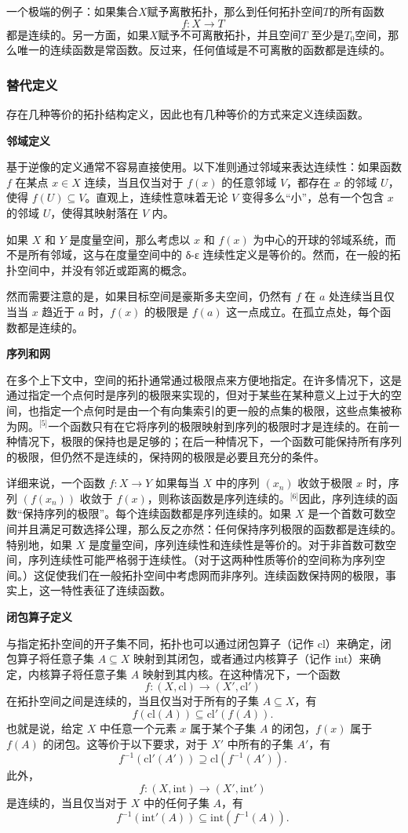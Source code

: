 一个极端的例子：如果集合$X$赋予离散拓扑，那么到任何拓扑空间$T$的所有函数
$$
f \colon X \rightarrow T~
$$
都是连续的。另一方面，如果$X$赋予不可离散拓扑，并且空间$T$ 至少是$T_0$空间，那么唯一的连续函数是常函数。反过来，任何值域是不可离散的函数都是连续的。
\subsubsection{替代定义}
存在几种等价的拓扑结构定义，因此也有几种等价的方式来定义连续函数。

\textbf{邻域定义}

基于逆像的定义通常不容易直接使用。以下准则通过邻域来表达连续性：如果函数 $f$ 在某点 $x \in X$ 连续，当且仅当对于 $f(x)$ 的任意邻域 $V$，都存在 $x$ 的邻域 $U$，使得 $f(U) \subseteq V$。直观上，连续性意味着无论 $V$ 变得多么“小”，总有一个包含 $x$ 的邻域 $U$，使得其映射落在 $V$ 内。

如果 $X$ 和 $Y$ 是度量空间，那么考虑以 $x$ 和 $f(x)$ 为中心的开球的邻域系统，而不是所有邻域，这与在度量空间中的 δ-ε 连续性定义是等价的。然而，在一般的拓扑空间中，并没有邻近或距离的概念。

然而需要注意的是，如果目标空间是豪斯多夫空间，仍然有 $f$ 在 $a$ 处连续当且仅当当 $x$ 趋近于 $a$ 时，$f(x)$ 的极限是 $f(a)$ 这一点成立。在孤立点处，每个函数都是连续的。

\textbf{序列和网}

在多个上下文中，空间的拓扑通常通过极限点来方便地指定。在许多情况下，这是通过指定一个点何时是序列的极限来实现的，但对于某些在某种意义上过于大的空间，也指定一个点何时是由一个有向集索引的更一般的点集的极限，这些点集被称为网。\(^\text{[5]}\)一个函数只有在它将序列的极限映射到序列的极限时才是连续的。在前一种情况下，极限的保持也是足够的；在后一种情况下，一个函数可能保持所有序列的极限，但仍然不是连续的，保持网的极限是必要且充分的条件。

详细来说，一个函数 $f: X \rightarrow Y$ 如果每当 $X$ 中的序列 $(x_n)$ 收敛于极限 $x$ 时，序列 $(f(x_n))$ 收敛于 $f(x)$，则称该函数是序列连续的。\(^\text{[6]}\)因此，序列连续的函数“保持序列的极限”。每个连续函数都是序列连续的。如果 $X$ 是一个首数可数空间并且满足可数选择公理，那么反之亦然：任何保持序列极限的函数都是连续的。特别地，如果 $X$ 是度量空间，序列连续性和连续性是等价的。对于非首数可数空间，序列连续性可能严格弱于连续性。（对于这两种性质等价的空间称为序列空间。）这促使我们在一般拓扑空间中考虑网而非序列。连续函数保持网的极限，事实上，这一特性表征了连续函数。

\textbf{闭包算子定义}

与指定拓扑空间的开子集不同，拓扑也可以通过闭包算子（记作 cl）来确定，闭包算子将任意子集 $A \subseteq X$ 映射到其闭包，或者通过内核算子（记作 int）来确定，内核算子将任意子集 $A$ 映射到其内核。在这种情况下，一个函数
$$
f: (X, \mathrm{cl}) \to (X', \mathrm{cl'})~
$$
在拓扑空间之间是连续的，当且仅当对于所有的子集 $A \subseteq X$，有
$$
f(\mathrm{cl}(A)) \subseteq \mathrm{cl'}(f(A)).~
$$
也就是说，给定 $X$ 中任意一个元素 $x$ 属于某个子集 $A$ 的闭包，$f(x)$ 属于 $f(A)$ 的闭包。这等价于以下要求，对于 $X'$ 中所有的子集 $A'$，有
$$
f^{-1}(\mathrm{cl'}(A')) \supseteq \mathrm{cl}(f^{-1}(A')).~
$$
此外，
$$
f: (X, \mathrm{int}) \to (X', \mathrm{int'})~
$$
是连续的，当且仅当对于 $X$ 中的任何子集 $A$，有
$$
f^{-1}(\mathrm{int'}(A)) \subseteq \mathrm{int}(f^{-1}(A)).~
$$
